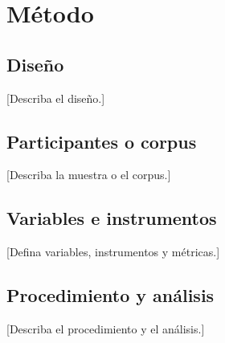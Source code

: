 \section{Método}

\subsection{Diseño}
[Describa el diseño.]

\subsection{Participantes o corpus}
[Describa la muestra o el corpus.]

\subsection{Variables e instrumentos}
[Defina variables, instrumentos y métricas.]

\subsection{Procedimiento y análisis}
[Describa el procedimiento y el análisis.]

